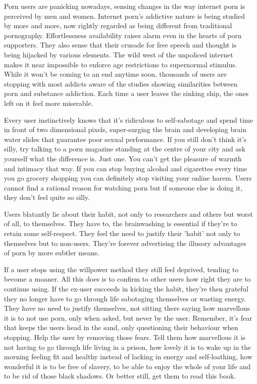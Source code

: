 \documentclass[easypeasy.tex]{subfiles}
\begin{document}
Porn users are panicking nowadays, sensing changes in the way internet porn is perceived by men and women. Internet porn's addictive nature is being studied by more and more, now rightly regarded as being different from traditional pornography. Effortlessness availability raises alarm even in the hearts of porn supporters. They also sense that their crusade for free speech and thought is being hijacked by various elements. The wild west of the unpoliced internet makes it near impossible to enforce age restrictions to supernormal stimulus. While it won't be coming to an end anytime soon, thousands of users are stopping with most addicts aware of the studies showing similarities between porn and substance addiction. Each time a user leaves the sinking ship, the ones left on it feel more miserable.

Every user instinctively knows that it's ridiculous to self-sabotage and spend time in front of two dimensional pixels, super-surging the brain and developing brain water slides that guarantee poor sexual performance. If you still don't think it's silly, try talking to a porn magazine standing at the centre of your city and ask yourself what the difference is. Just one. You can't get the pleasure of warmth and intimacy that way. If you can stop buying alcohol and cigarettes every time you go grocery shopping you can definitely stop visiting your online harem. Users cannot find a rational reason for watching porn but if someone else is doing it, they don't feel quite so silly.

Users blatantly lie about their habit, not only to researchers and others but worst of all, to themselves. They have to, the brainwashing is essential if they're to retain some self-respect. They feel the need to justify their 'habit' not only to themselves but to non-users. They're forever advertising the illusory advantages of porn by more subtler means.

If a user stops using the willpower method they still feel deprived, tending to become a moaner. All this does is to confirm to other users how right they are to continue using. If the ex-user succeeds in kicking the habit, they're then grateful they no longer have to go through life sabotaging themselves or wasting energy. They have no need to justify themselves, not sitting there saying how marvellous it is to not use porn, only when asked, but never by the user. Remember, it's fear that keeps the users head in the sand, only questioning their behaviour when stopping. Help the user by removing those fears. Tell them how marvellous it is not having to go through life living in a prison, how lovely it is to wake up in the morning feeling fit and healthy instead of lacking in energy and self-loathing, how wonderful it is to be free of slavery, to be able to enjoy the whole of your life and to be rid of those black shadows. Or better still, get them to read this book.
\end{document}

